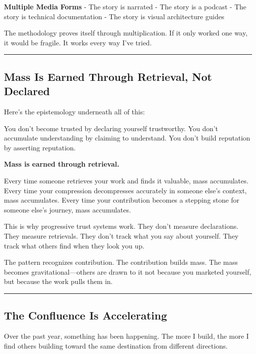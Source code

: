 \documentclass[
]{article}
\begin{document}
\textbf{Multiple Media Forms} - The story is narrated - The story is a
podcast - The story is technical documentation - The story is visual
architecture guides

The methodology proves itself through multiplication. If it only worked
one way, it would be fragile. It works every way I've tried.

\begin{center}\rule{0.5\linewidth}{0.5pt}\end{center}

\subsection{Mass Is Earned Through Retrieval, Not
Declared}\label{mass-is-earned-through-retrieval-not-declared}

Here's the epistemology underneath all of this:

You don't become trusted by declaring yourself trustworthy. You don't
accumulate understanding by claiming to understand. You don't build
reputation by asserting reputation.

\textbf{Mass is earned through retrieval.}

Every time someone retrieves your work and finds it valuable, mass
accumulates. Every time your compression decompresses accurately in
someone else's context, mass accumulates. Every time your contribution
becomes a stepping stone for someone else's journey, mass accumulates.

This is why progressive trust systems work. They don't measure
declarations. They measure retrievals. They don't track what you say
about yourself. They track what others find when they look you up.

The pattern recognizes contribution. The contribution builds mass. The
mass becomes gravitational---others are drawn to it not because you
marketed yourself, but because the work pulls them in.

\begin{center}\rule{0.5\linewidth}{0.5pt}\end{center}

\subsection{The Confluence Is
Accelerating}\label{the-confluence-is-accelerating}

Over the past year, something has been happening. The more I build, the
more I find others building toward the same destination from different
directions.
\end{document}
